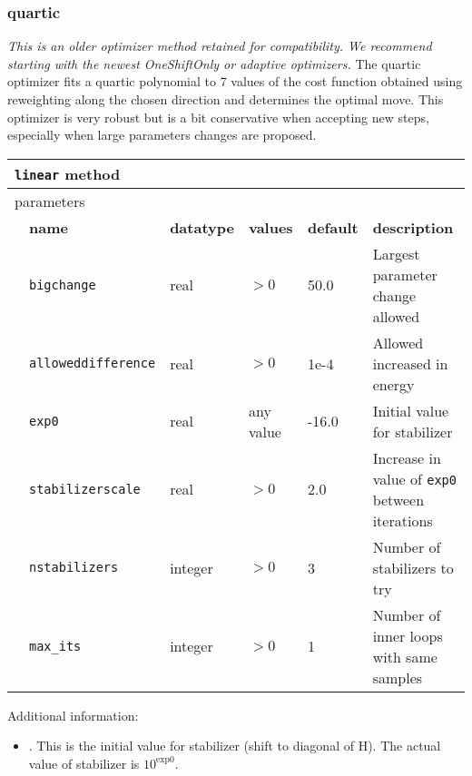 \subsubsection{quartic}
\textit{This is an older optimizer method retained for compatibility. We recommend starting with the newest OneShiftOnly or adaptive optimizers.}
The quartic optimizer fits a quartic polynomial to 7 values of the cost function obtained using reweighting along the chosen direction and determines the optimal move.
This optimizer is very robust but is a bit conservative when accepting new steps, especially when large parameters changes are proposed.
\begin{table}[h]
\begin{center}
\begin{tabularx}{\textwidth}{l l l l l X }
\hline
\multicolumn{6}{l}{\texttt{linear} method} \\
\hline
\multicolumn{2}{l}{parameters}  & \multicolumn{4}{l}{}\\
   &   \bfseries name     & \bfseries datatype & \bfseries values & \bfseries default   & \bfseries description \\
   &   \texttt{bigchange} &  real     & $>0$ & 50.0  & Largest parameter change allowed\\
   &   \texttt{alloweddifference} &  real     & $>0$ & 1e-4 & Allowed increased in energy\\
   &   \texttt{exp0} &  real     & any value & -16.0 & Initial value for stabilizer\\
   &   \texttt{stabilizerscale} &  real     & $>0$ & 2.0 & Increase in value of \texttt{exp0} between iterations\\
   &   \texttt{nstabilizers} &  integer     & $>0$ & 3 & Number of stabilizers to try\\
   &   \texttt{max\_its} &  integer   & $>0$ & 1 & Number of inner loops with same samples\\
  \hline
\end{tabularx}
\end{center}
\end{table}

Additional information:
\begin{itemize}
\item {}. This is the initial value for stabilizer (shift to diagonal of H). The actual value of stabilizer is $10^{\textrm{exp0}}$.
\end{itemize}

